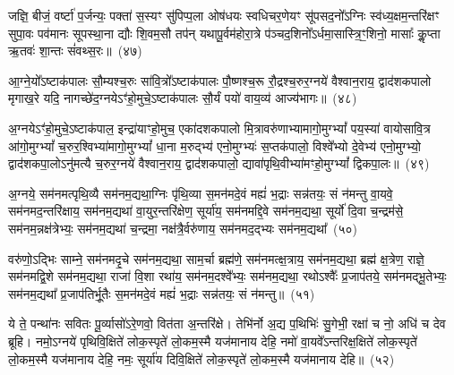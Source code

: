 जज्ञि॒ बीजं॒ वर्\mbox{}ष्टा॑ प॒र्जन्यः॒ पक्ता॑ स॒स्यꣳ सु॑पिप्प॒ला ओष॑धयः स्वधिचर॒णेयꣳ सू॑पसद॒नो᳚\-ऽग्निः स्व॑ध्य॒क्षम॒न्तरि॑क्षꣳ सुपा॒वः पव॑मानः सूपस्था॒ना द्यौः शि॒वम॒सौ तप॑न् यथापू॒र्वम॑होरा॒त्रे प॑ञ्चद॒शिनो᳚\-ऽर्धमा॒सास्त्रि॒ꣳ॒शिनो॒ मासाः᳚ कॢ॒प्ता ऋ॒तवः॑ शा॒न्तः सं॑वथ्स॒रः॥~(४७)

{\anuvakamend[{जज्ञि॒ बीज॒मेक॑त्रिꣳशत्}]}%

आ॒ग्ने॒यो᳚\-ऽष्टाक॑पालः सौ॒म्यश्च॒रुः सा॑वि॒त्रो᳚\-ऽष्टाक॑पालः पौ॒ष्णश्च॒रू रौ॒द्रश्च॒रुर॒ग्नये॑ वैश्वान॒राय॒ द्वाद॑श\-कपालो मृगाख॒रे यदि॒ नागच्छे॑द॒ग्नये\-ऽꣳ॑हो॒मुचे॒\-ऽष्टाक॑पालः सौ॒र्यं पयो॑ वाय॒व्य॑ आज्य॑भागः॥~(४८)

{\anuvakamend[{आ॒ग्ने॒यश्चतु॑र्विꣳशतिः}]}%

अ॒ग्नये\-ऽꣳ॑हो॒मुचे॒\-ऽष्टाक॑पाल॒ इन्द्रा॑याꣳहो॒मुच॒ एका॑\-दश\-कपालो मि॒त्रावरु॑णाभ्यामागो॒मुग्\-भ्यां᳚ पय॒स्या॑ वायोसावि॒त्र आ॑गो॒मुग्\-भ्यां᳚ च॒रुर॒श्विभ्या॑मागो॒मुग्\-भ्यां᳚ धा॒ना म॒रुद्भ्य॑ एनो॒मुग्भ्यः॑ स॒प्तक॑पालो॒ विश्वे᳚भ्यो दे॒वेभ्य॑ एनो॒मुग्भ्यो॒ द्वाद॑श\-कपा॒लो\-ऽनु॑मत्यै च॒रुर॒ग्नये॑ वैश्वान॒राय॒ द्वाद॑श\-कपालो॒ द्यावा॑\-पृथि॒वीभ्या॑मꣳहो॒मुग्\-भ्यां᳚ द्विकपा॒लः॥~(४९)

{\anuvakamend[{अ॒ग्नये\-ऽꣳ॑हो॒मुचे᳚ त्रि॒ꣳ॒शत्}]}%

अ॒ग्नये॒ सम॑नमत्पृथि॒व्यै सम॑नम॒द्यथा॒ग्निः पृ॑थि॒व्या स॒मन॑मदे॒वं मह्यं॑ भ॒द्राः सन्न॑तयः॒ सं न॑मन्तु वा॒यवे॒ सम॑नमद॒न्तरि॑क्षाय॒ सम॑नम॒द्यथा॑ वा॒युर॒न्तरि॑क्षेण॒ सूर्या॑य॒ सम॑नमद्दि॒वे सम॑नम॒द्यथा॒ सूर्यो॑ दि॒वा च॒न्द्रम॑से॒ सम॑नम॒न्नक्ष॑त्रेभ्यः॒ सम॑नम॒द्यथा॑ च॒न्द्रमा॒ नक्ष॑त्रै॒र्वरु॑णाय॒ सम॑नमद॒द्भ्यः सम॑नम॒द्यथा᳚~(५०)

वरु॑णो॒\-ऽद्भिः साम्ने॒ सम॑नमदृ॒चे सम॑नम॒द्यथा॒ साम॒र्चा ब्रह्म॑णे॒ सम॑नमत्क्ष॒त्राय॒ सम॑नम॒द्यथा॒ ब्रह्म॑ क्ष॒त्रेण॒ राज्ञे॒ सम॑नमद्वि॒शे सम॑नम॒द्यथा॒ राजा॑ वि॒शा रथा॑य॒ सम॑नम॒दश्वे᳚भ्यः॒ सम॑नम॒द्यथा॒ रथो\-ऽश्वैः᳚ प्र॒जा\-प॑तये॒ सम॑नमद्भू॒तेभ्यः॒ सम॑नम॒द्यथा᳚ प्र॒जा\-प॑तिर्भू॒तैः स॒मन॑मदे॒वं मह्यं॑ भ॒द्राः सन्न॑तयः॒ सं न॑मन्तु॥~(५१)

{\anuvakamend[{अ॒द्भ्यः सम॑नम॒द्यथा॒ मह्यं॑ च॒त्वारि॑ च}]}%

ये ते॒ पन्था॑नः सवितः पू॒र्व्यासो॑\-ऽरे॒णवो॒ वित॑ता अ॒न्तरि॑क्षे। तेभि॑र्नो अ॒द्य प॒थिभिः॑ सु॒गेभी॒ रक्षा॑ च नो॒ अधि॑ च देव ब्रूहि। नमो॒\-ऽग्नये॑ पृथिवि॒क्षिते॑ लोक॒स्पृते॑ लो॒कम॒स्मै यज॑मानाय देहि॒ नमो॑ वा॒यवे᳚\-ऽन्तरिक्ष॒क्षिते॑ लोक॒स्पृते॑ लो॒कम॒स्मै यज॑मानाय देहि॒ नमः॒ सूर्या॑य दिवि॒क्षिते॑ लोक॒स्पृते॑ लो॒कम॒स्मै यज॑मानाय देहि॥~(५२)

{\anuvakamend[{ये ते॒ चतु॑श्चत्वारिꣳशत्}]}%

